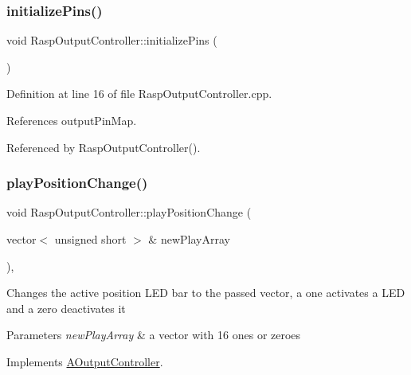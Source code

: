 \subsubsection{\texorpdfstring{initialize\+Pins()}{initializePins()}}
{\footnotesize\ttfamily void Rasp\+Output\+Controller\+::initialize\+Pins (\begin{DoxyParamCaption}{ }\end{DoxyParamCaption})\hspace{0.3cm}{\ttfamily [private]}}



Definition at line 16 of file Rasp\+Output\+Controller.\+cpp.



References output\+Pin\+Map.



Referenced by Rasp\+Output\+Controller().

\mbox{\label{class_rasp_output_controller_af0304196681872f9c1f6d6f2e2db14a6}} 
\subsubsection{\texorpdfstring{play\+Position\+Change()}{playPositionChange()}\hspace{0.1cm}{\footnotesize\ttfamily [1/2]}}
{\footnotesize\ttfamily void Rasp\+Output\+Controller\+::play\+Position\+Change (\begin{DoxyParamCaption}\item[{vector$<$ unsigned short $>$ \&}]{new\+Play\+Array }\end{DoxyParamCaption})\hspace{0.3cm}{\ttfamily [override]}, {\ttfamily [virtual]}}

Changes the active position L\+ED bar to the passed vector, a one activates a L\+ED and a zero deactivates it 
\begin{DoxyParams}{Parameters}
{\em new\+Play\+Array} & a vector with 16 ones or zeroes \\
\hline
\end{DoxyParams}


Implements \hyperlink{class_a_output_controller_a7bad658dfc3eb1223ace0c0454130818}{A\+Output\+Controller}.



